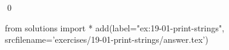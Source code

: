 
\begin{ex}
  \label{ex:19-01-print-strings}
  
  \qed
\end{ex}
\begin{python0}
from solutions import *
add(label="ex:19-01-print-strings",
    srcfilename='exercises/19-01-print-strings/answer.tex')
\end{python0}
